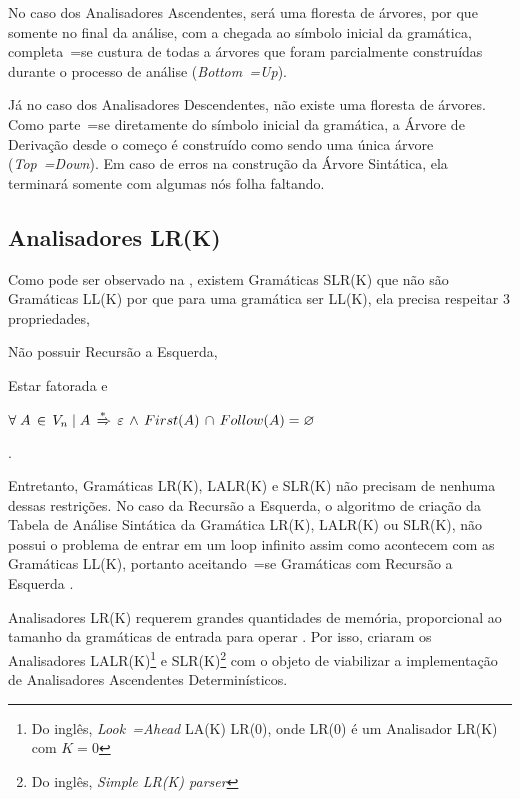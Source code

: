 No caso dos Analisadores Ascendentes,
será uma floresta de árvores,
por que somente no final da análise,
com a chegada ao símbolo inicial da gramática,
completa~=se custura de todas a árvores que foram parcialmente construídas durante o processo de análise (\textit{Bottom~=Up}).

Já no caso dos Analisadores Descendentes,
não existe uma floresta de árvores.
Como parte~=se diretamente do símbolo inicial da gramática,
a Árvore de Derivação desde o começo é construído como sendo uma única árvore (\textit{Top~=Down}).
Em caso de erros na construção da Árvore Sintática,
ela terminará somente com algumas nós folha faltando.


\subsection{Analisadores LR(K)}

Como pode ser observado na ,
existem Gramáticas SLR(K) que não são Gramáticas LL(K) por que para uma gramática ser LL(K),
ela precisa respeitar 3 propriedades,
\begin{inparaenum}[1)]
    \item Não possuir Recursão a Esquerda,
    \item Estar fatorada e
    \item $\forall\; A\, \in\, V_n\; |\; A\,
            \xRightarrow{*}\, \varepsilon\,
            \land\, First(A)\, \cap\, Follow(A) = \varnothing$
\end{inparaenum}
\cite{ahoCompilerDragonBook}.

Entretanto,
Gramáticas LR(K), LALR(K) e
SLR(K) não precisam de nenhuma dessas restrições.
No caso da Recursão a Esquerda,
o algoritmo de criação da Tabela de Análise Sintática da Gramática LR(K),
LALR(K) ou SLR(K),
não possui o problema de entrar em um loop infinito assim como acontecem com as Gramáticas LL(K),
portanto aceitando~=se Gramáticas com Recursão a Esquerda \cite{ahoCompilerDragonBook}.

Analisadores LR(K) requerem grandes quantidades de memória,
proporcional ao tamanho da gramáticas de entrada para operar \cite{complexityOfLRKTesting}.
Por isso,
 criaram os Analisadores LALR(K)\footnote{
Do inglês, \textit{Look~=Ahead} LA(K) LR(0),
onde LR(0) é um Analisador LR(K) com $K=0$
}
e SLR(K)\footnote{
Do inglês, \textit{Simple LR(K) parser}
}
com o objeto de viabilizar a implementação de Analisadores Ascendentes Determinísticos.

